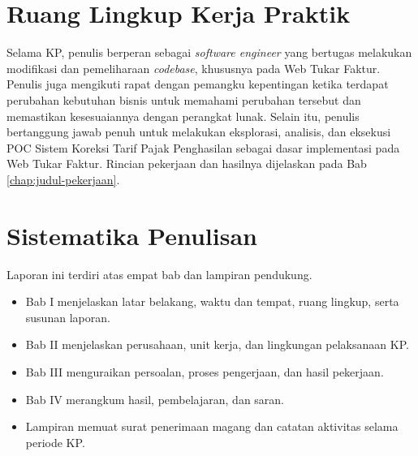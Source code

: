 \section{Ruang Lingkup Kerja Praktik}
\label{sec:ruang_lingkup}
Selama KP, penulis berperan sebagai \textit{software engineer} yang bertugas melakukan modifikasi dan pemeliharaan \textit{codebase}, khususnya pada Web Tukar Faktur. Penulis juga mengikuti rapat dengan pemangku kepentingan ketika terdapat perubahan kebutuhan bisnis untuk memahami perubahan tersebut dan memastikan kesesuaiannya dengan perangkat lunak. Selain itu, penulis bertanggung jawab penuh untuk melakukan eksplorasi, analisis, dan eksekusi \label{abbr:POC}POC Sistem Koreksi Tarif Pajak Penghasilan sebagai dasar implementasi pada Web Tukar Faktur. Rincian pekerjaan dan hasilnya dijelaskan pada Bab \ref{chap:judul-pekerjaan}.

\section{Sistematika Penulisan}
Laporan ini terdiri atas empat bab dan lampiran pendukung.
\begin{itemize}
    \item Bab I menjelaskan latar belakang, waktu dan tempat, ruang lingkup, serta susunan laporan.
    \item Bab II menjelaskan perusahaan, unit kerja, dan lingkungan pelaksanaan KP.
    \item Bab III menguraikan persoalan, proses pengerjaan, dan hasil pekerjaan.
    \item Bab IV merangkum hasil, pembelajaran, dan saran.
    \item Lampiran memuat surat penerimaan magang dan catatan aktivitas selama periode KP.
\end{itemize}
